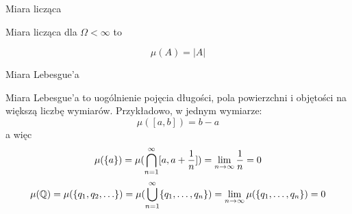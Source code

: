 \begin{example}
	Miara licząca
	
	Miara licząca dla \(\Omega < \infty\) to
	
	\[
		\mu(A) = |A|
	\]
\end{example}
\begin{example} 
	Miara Lebesgue'a
	
	Miara Lebesgue'a to uogólnienie pojęcia długości, pola powierzchni i objętości na większą liczbę wymiarów. Przykładowo, w jednym wymiarze:
	\[
		\mu([a, b]) = b - a
	\]
	a więc
	\[
		\mu(\set{a}) = \mu(\bigcap_{n=1}^\infty [a, a + \frac{1}{n}]) = \lim_{n \to \infty} \frac{1}{n} = 0
	\]
	\[
		\mu(\rational) = \mu(\set{q_1, q_2, \dots}) = \mu(\bigcup_{n=1}^\infty \set{q_1, \dots, q_n}) = \lim_{n \to \infty} \mu(\set{q_1, \dots, q_n}) = 0
	\]
\end{example}
